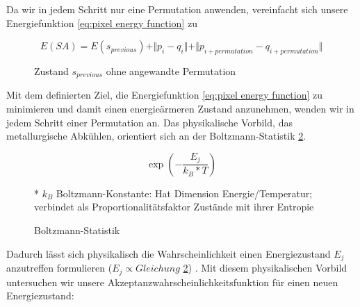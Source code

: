 Da wir in jedem Schritt nur eine Permutation anwenden, vereinfacht sich unsere Energiefunktion
\ref{eq:pixel energy function} zu 

\begin{figure}[H]
    \begin{tcolorbox}[rightrule=3mm, rounded corners=east]
    \[ E(SA) = E(s_{previous}) + \Vert{p_{i}-q_{i}}\Vert + \Vert{p_{i 
        + permutation}-q_{i + permutation}}\Vert\]
    \end{tcolorbox}
  \caption{Zustand $s_{previous}$ ohne angewandte Permutation}
  \label{eq:vereinfachte pixel energy function}
\end{figure}

\newpage
Mit dem definierten Ziel, die Energiefunktion \ref{eq:pixel energy function} zu minimieren und damit einen energieärmeren Zustand anzunehmen,
wenden wir in jedem Schritt einer Permutation an. Das physikalische Vorbild, das metallurgische Abkühlen, orientiert sich an 
der Boltzmann-Statistik \ref{eq:Boltzmann-Statistik}.

\begin{figure}[H]
    \begin{tcolorbox}[rightrule=3mm, rounded corners=east]
    \[ \exp(-\frac{E_{j}}{k_{B}*T}) \]
    \end{tcolorbox}
    \caption{Boltzmann-Statistik}
    \label{eq:Boltzmann-Statistik}
    \medskip
    \small
    * $k_{B}$ Boltzmann-Konstante: Hat Dimension Energie/Temperatur; verbindet als Proportionalitätsfaktor
    Zustände mit ihrer Entropie
\end{figure}

Dadurch lässt sich physikalisch die Wahrscheinlichkeit einen Energiezustand $E_{j}$ anzutreffen formulieren 
($E_{j}\propto Gleichung$ \ref{eq:Boltzmann-Statistik}) \cite{Kirkpatrick671}. Mit diesem physikalischen Vorbild untersuchen 
wir unsere Akzeptanzwahrscheinlichkeitsfunktion für einen neuen Energiezustand: 

